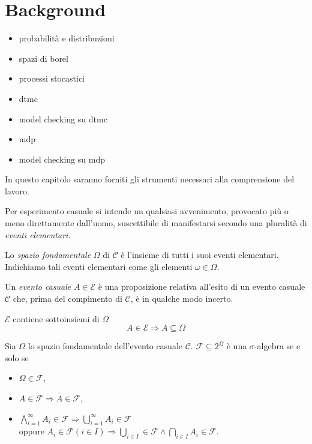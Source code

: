 \chapter{Background}


\begin{itemize}
	\item probabilità e distribuzioni
	\item spazi di borel
	\item processi stocastici
	\item dtmc
	\item model checking su dtmc
	\item mdp
	\item model checking su mdp
\end{itemize}

In questo capitolo saranno forniti gli strumenti necessari alla comprensione del lavoro.

\begin{mtdef}
	Per esperimento casuale si intende un qualsiasi avvenimento, provocato più o meno direttamente dall'uomo, suscettibile di manifestarsi secondo una pluralità di \emph{eventi elementari}.
\end{mtdef}

\begin{mtdef}
	Lo \emph{spazio fondamentale} $\Omega$ di $\mathcal{C}$ è l'insieme di tutti i suoi eventi elementari. Indichiamo tali eventi elementari come gli elementi $\omega \in \Omega$.
\end{mtdef}

\begin{mtdef}
	Un \emph{evento casuale} $A \in \mathcal{E}$ è una proposizione relativa all'esito di un evento casuale $\mathcal{C}$ che, prima del compimento di $\mathcal{C}$, è in qualche modo incerto.
\end{mtdef}

\begin{mtobs}
	$\mathcal{E}$ contiene sottoinsiemi di $\Omega$
	$$ A \in \mathcal{E} \Rightarrow A \subseteq \Omega $$
\end{mtobs}

\begin{mtdef}
	Sia $\Omega$ lo spazio fondamentale dell'evento casuale $\mathcal{C}$. $\mathcal{F} \subseteq 2^\Omega$ è una $\sigma$-algebra se e solo se
	\begin{itemize}
		\item $\Omega \in \mathcal{F}$,
		\item $A \in \mathcal{F} \Rightarrow \overline{A} \in \mathcal{F}$,
		\item $\bigwedge_{i=1}^{\infty} A_i \in \mathcal{F} \Rightarrow \bigcup_{i=1}^\infty A_i \in \mathcal{F}$ \\ oppure $A_i \in \mathcal{F} (i \in I) \Rightarrow \bigcup_{i \in I} \in \mathcal{F} \wedge \bigcap_{i \in I} A_i \in \mathcal{F}$.
	\end{itemize}
\end{mtdef}

